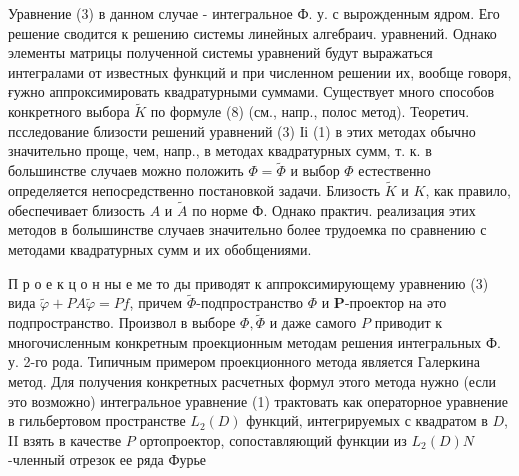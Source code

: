 \documentclass[10pt]{article}
\begin{document}
Уравнение (3) в данном случае - интегральное Ф. у. с вырожденным ядром. Его решение сводится к решению системы линейных алгебраич. уравнений. Однако элементы матрицы полученной системы уравнений будут выражаться интегралами от известных функций и при численном решении их, вообще говоря, ғужно аппроксимировать квадратурными суммами. Существует много способов конкретного выбора $\widetilde{K}$ по формуле (8) (см., напр., полос метод). Теоретич. псследование близости решений уравнений (3) Іі (1) в этих методах обычно значительно проще, чем, напр., в методах квадратурных сумм, т. к. в большинстве случаев можно положить $\Phi=\tilde{\Phi}$ и выбор $\Phi$ естественно определяется непосредственно постановкой задачи. Близость $\tilde{K}$ и $K$, как правило, обеспечивает близость $A$ и $\tilde{A}$ по норме Ф. Однако практич. реализация этих методов в болышинстве случаев значительно более трудоемка по сравнению с методами квадратурных сумм и их обобщениями.



П р о е к ц о н ны е ме то ды приводят к аппроксимирующему уравнению (3) вида $\tilde{\varphi}+P A \tilde{\varphi}=P f$, причем $\tilde{\Phi}$-подпространство $\Phi$ и $\boldsymbol{P}$-проектор на әто подпространство. Произвол в выборе $\Phi, \tilde{\Phi}$ и даже самого $P$ приводит к многочисленным конкретным проекционным методам решения интегральных Ф. у. 2-го рода. Типичным примером проекционного метода является Галеркина метод. Для получения конкретных расчетных формул этого метода нужно (если это возможно) интегральное уравнение (1) трактовать как операторное уравнение в гильбертовом пространстве $L_{2}(D)$ функций, интегрируемых с квадратом в $D$, II взять в качестве $P$ ортопроектор, сопоставляющий функции из $L_{2}(D) N$-членный отрезок ее ряда Фурье
\end{document}

